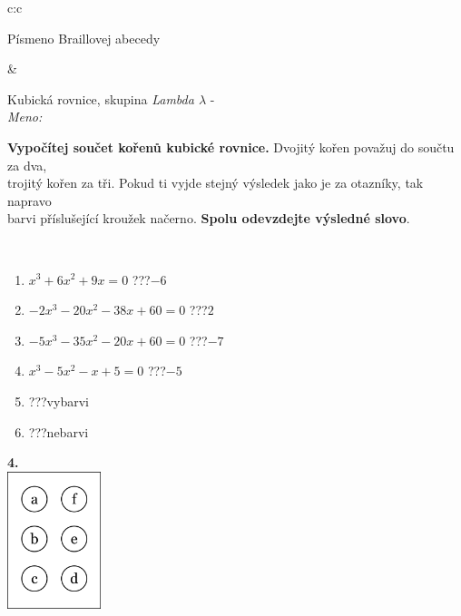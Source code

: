 \documentclass[10pt]{report}
\begin{document}
\begin{tabular}{c:c}
\begin{minipage}[c][104.5mm][t]{0.5\linewidth}
\begin{center}
\begin{minipage}{0.20\linewidth}
\begin{center}
{\small Písmeno Braillovej abecedy}
\end{center}
\end{minipage}
\end{center}
\end{minipage}
&
\begin{minipage}[c][104.5mm][t]{0.5\linewidth}
\begin{center}
\vspace{7mm}
{\huge Kubická rovnice, skupina \textit{Lambda $\lambda$} -}\\[5mm]
\textit{Meno:}\phantom{xxxxxxxxxxxxxxxxxxxxxxxxxxxxxxxxxxxxxxxxxxxxxxxxxxxxxxxxxxxxxxxxx}\\[5mm]
\begin{minipage}{0.95\linewidth}
\textbf{Vypočítej součet kořenů kubické rovnice.} Dvojitý kořen považuj do součtu za dva,\\trojitý kořen za tři. Pokud ti vyjde stejný výsledek jako je za otazníky, tak napravo\\barvi příslušející kroužek načerno. \textbf{Spolu odevzdejte výsledné slovo}.
\end{minipage}
\\[1mm]
\begin{minipage}{0.79\linewidth}
\begin{center}
\begin{varwidth}{\linewidth}
\begin{enumerate}
\Large
\item $x^3+6x^2+9x=0$\quad \dotfill\; ???\;\dotfill \quad $-6$
\item $-2x^3-20x^2-38x+60=0$\quad \dotfill\; ???\;\dotfill \quad $2$
\item $-5x^3-35x^2-20x+60=0$\quad \dotfill\; ???\;\dotfill \quad $-7$
\item $x^3-5x^2-x+5=0$\quad \dotfill\; ???\;\dotfill \quad $-5$
\item \quad \dotfill\; ???\;\dotfill \quad vybarvi
\item \quad \dotfill\; ???\;\dotfill \quad nebarvi
\end{enumerate}
\end{varwidth}
\end{center}
\end{minipage}
\begin{minipage}{0.20\linewidth}
\begin{center}
{\Huge\bfseries 4.} \\[2mm]
\includegraphics[height=40mm]{../images/braille.png}

\end{center}
\end{minipage}
\end{center}
\end{minipage}
\end{tabular}
\end{document}
